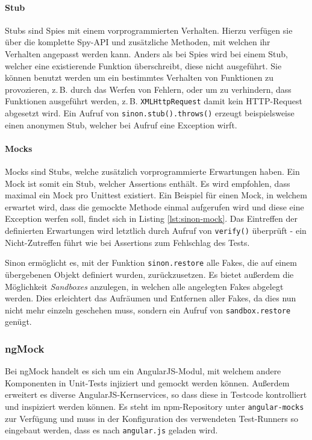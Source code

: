 \paragraph*{Stub}
Stubs sind Spies mit einem vorprogrammierten Verhalten. Hierzu verfügen sie über die komplette Spy-API und zusätzliche Methoden, mit welchen ihr Verhalten angepasst werden kann. Anders als bei Spies wird bei einem Stub, welcher eine existierende Funktion überschreibt, diese nicht ausgeführt. Sie können benutzt werden um ein bestimmtes Verhalten von Funktionen zu provozieren, z.\,B. durch das Werfen von Fehlern, oder um zu verhindern, dass Funktionen ausgeführt werden, z.\,B. \texttt{XMLHttpRequest} damit kein HTTP-Request abgesetzt wird. Ein Aufruf von \texttt{sinon.stub().throws()} erzeugt beispielsweise einen anonymen Stub, welcher bei Aufruf eine Exception wirft.\cite{sinonjs-stubs}

\paragraph*{Mocks}
Mocks sind Stubs, welche zusätzlich vorprogrammierte Erwartungen haben. Ein Mock ist somit ein Stub, welcher Assertions enthält. Es wird empfohlen, dass maximal ein Mock pro Unittest existiert. Ein Beispiel für einen Mock, in welchem erwartet wird, dass die gemockte Methode einmal aufgerufen wird und diese eine Exception werfen soll, findet sich in Listing \ref{lst:sinon-mock}. Das Eintreffen der definierten Erwartungen wird letztlich durch Aufruf von \texttt{verify()} überprüft - ein Nicht-Zutreffen führt wie bei Assertions zum Fehlschlag des Tests.\cite{sinonjs-mocks}

\begin{figure}[H]
	
\end{figure}

Sinon ermöglicht es, mit der Funktion \texttt{sinon.restore} alle Fakes, die auf einem übergebenen Objekt definiert wurden, zurückzusetzen. Es bietet außerdem die Möglichkeit \textit{Sandboxes} anzulegen, in welchen alle angelegten Fakes abgelegt werden. Dies erleichtert das Aufräumen und Entfernen aller Fakes, da dies nun nicht mehr einzeln geschehen muss, sondern ein Aufruf von \texttt{sandbox.restore} genügt.\cite{sinonjs-sandboxes}

\subsubsection{ngMock}
\label{sec:ngMock}
Bei ngMock handelt es sich um ein AngularJS-Modul, mit welchem andere Komponenten in Unit-Tests injiziert und gemockt werden können. Außerdem erweitert es diverse AngularJS-Kernservices, so dass diese in Testcode kontrolliert und inspiziert werden können. Es steht im npm-Repository unter \texttt{angular-mocks} zur Verfügung und muss in der Konfiguration des verwendeten Test-Runners so eingebaut werden, dass es nach \texttt{angular.js} geladen wird.\cite{angular-ngMock}

